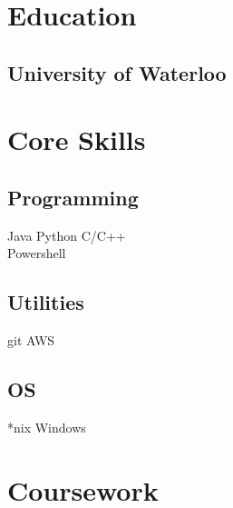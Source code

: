 \documentclass[letterpaper]{deedy-resume} %
\begin{document}
\begin{minipage}[t]{0.33\textwidth} %


\section{Education} 

\subsection{University of Waterloo}



\section{Core Skills}

\subsection{Programming}

Java \textbullet{} Python \textbullet{} C/C++ \\
Powershell \\ 

\sectionspace %

\subsection{Utilities}
git \textbullet{} AWS

\sectionspace %

\subsection{OS}
*nix \textbullet{} Windows 


\section{Coursework}


\end{minipage}
\end{document}

